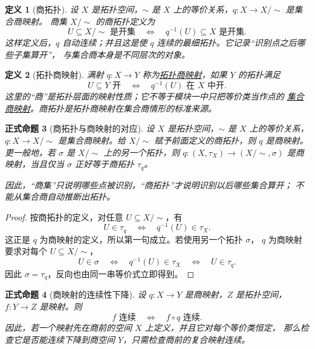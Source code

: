 \documentclass[UTF8,fontset=none,a4paper,11pt]{ctexart}
\theoremstyle{foundation-definition}
\newtheorem{definition}{定义}[section]
\theoremstyle{foundation-theorem}
\theoremstyle{foundation-proposition}
\newtheorem{proposition}[definition]{正式命题}
\theoremstyle{foundation-example}
\theoremstyle{foundation-remark}
\theoremstyle{foundation-theorem}
\newcommand{\term}[2]{\hyperref[#1]{#2}}
\begin{document}
\begin{definition}[商拓扑]\label{def:quotient-topology}
设 \(X\) 是拓扑空间，\(\sim\) 是 \(X\) 上的等价关系，\(q:X\to X/{\sim}\) 是集合商映射。
商集 \(X/{\sim}\) 的商拓扑定义为
\[
U\subseteq X/{\sim}\text{ 是开集}
\quad\Longleftrightarrow\quad
q^{-1}(U)\subseteq X\text{ 是开集}.
\]
这样定义后，\(q\) 自动连续；并且这是使 \(q\) 连续的最细拓扑。它记录“识别点之后哪些子集算开”，
与集合商本身是不同层次的对象。
\end{definition}

\begin{definition}[拓扑商映射]\label{def:topological-quotient-map}
满射 \(q:X\to Y\) 称为\term{def:topological-quotient-map}{拓扑商映射}，如果 \(Y\) 的拓扑满足
\[
U\subseteq Y\text{ 开}\quad\Longleftrightarrow\quad q^{-1}(U)\text{ 在 }X\text{ 中开}.
\]
这里的“商”是拓扑层面的映射性质；它不等于模块一中只把等价类当作点的
\term{def:quotient-map}{集合商映射}。商拓扑是拓扑商映射在集合商情形的标准来源。
\end{definition}

\begin{proposition}[商拓扑与商映射的对应]
\label{prop:quotient-topology-characterization}
设 $X$ 是拓扑空间，$\sim$ 是 $X$ 上的等价关系，
$q:X\to X/{\sim}$ 是集合商映射。给 $X/{\sim}$ 赋予前面定义的商拓扑，则
$q$ 是商映射。更一般地，若 $\sigma$ 是 $X/{\sim}$ 上的另一个拓扑，则
$q:(X,\tau_X)\to(X/{\sim},\sigma)$ 是商映射，当且仅当
$\sigma$ 正好等于商拓扑 $\tau_q$。

因此，“商集”只说明哪些点被识别，“商拓扑”才说明识别以后哪些集合算开；
不能从集合商自动推断出拓扑。
\end{proposition}

\begin{proof}
按商拓扑的定义，对任意 $U\subseteq X/{\sim}$，有
\[
 U\in\tau_q
 \quad\Longleftrightarrow\quad
 q^{-1}(U)\in\tau_X.
\]
这正是 $q$ 为商映射的定义，所以第一句成立。若使用另一个拓扑 $\sigma$，
$q$ 为商映射要求对每个 $U\subseteq X/{\sim}$，
\[
 U\in\sigma
 \quad\Longleftrightarrow\quad
 q^{-1}(U)\in\tau_X
 \quad\Longleftrightarrow\quad U\in\tau_q.
\]
因此 $\sigma=\tau_q$，反向也由同一串等价式立即得到。
\end{proof}

\begin{proposition}[商映射的连续性下降]\label{prop:quotient-continuity-descent}
设 \(q:X\to Y\) 是商映射，\(Z\) 是拓扑空间，\(f:Y\to Z\) 是映射。则
\[
f\text{ 连续}\quad\Longleftrightarrow\quad f\circ q\text{ 连续}.
\]
因此，若一个映射先在商前的空间 \(X\) 上定义，并且它对每个等价类恒定，
那么检查它是否能连续下降到商空间 \(Y\)，只需检查商前的复合映射连续。
\end{proposition}
\end{document}
